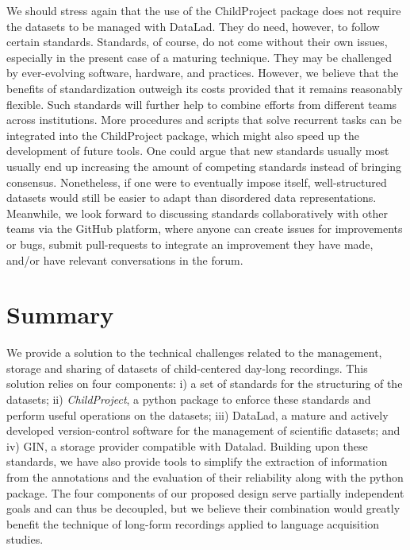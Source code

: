 \documentclass[smallextended]{svjour3}       %
\begin{document}
We should stress again that the use of the ChildProject package does not require the datasets to be managed with DataLad. They do need, however, to follow certain standards. Standards, of course, do not come without their own issues, especially in the present case of a maturing technique. They may be challenged by ever-evolving software, hardware, and practices. However, we believe that the benefits of standardization outweigh its costs provided that it remains reasonably flexible. Such standards will further help to combine efforts from different teams across institutions. More procedures and scripts that solve recurrent tasks can be integrated into the ChildProject package, which might also speed up the development of future tools. 
One could argue that new standards usually most usually end up increasing the amount of competing standards instead of bringing consensus. Nonetheless, if one were to eventually impose itself, well-structured datasets would still be easier to adapt than disordered data representations. Meanwhile, we look forward to discussing standards collaboratively with other teams via the GitHub platform, where anyone can create issues for improvements or bugs, submit pull-requests to integrate an improvement they have made, and/or have relevant conversations in the forum.

\section{Summary}


We provide a solution to the technical challenges related to the management, storage and sharing of datasets of child-centered day-long recordings. This solution relies on four components: i) a set of standards for the structuring of the datasets; ii) \emph{ChildProject}, a python package to enforce these standards and perform useful operations on the datasets; iii) DataLad, a mature and actively developed version-control software for the management of scientific datasets; and iv) GIN, a storage provider compatible with Datalad. Building upon these standards, we have also provide tools to simplify the extraction of information from the annotations and the evaluation of their reliability along with the python package. The four components of our proposed design serve partially independent goals and can thus be decoupled, but we believe their combination would greatly benefit the technique of long-form recordings applied to language acquisition studies.
\end{document}
